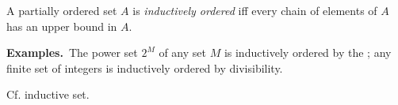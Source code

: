 \documentclass[12pt]{article}
\begin{document}
A partially ordered set $A$ is {\em inductively ordered} iff every chain of elements of $A$ has an upper bound in $A$.

\textbf{Examples.} \,The power set $2^M$ of any set $M$ is inductively ordered by the ; any finite set of integers is inductively ordered by divisibility.

Cf. inductive set.
\end{document}
